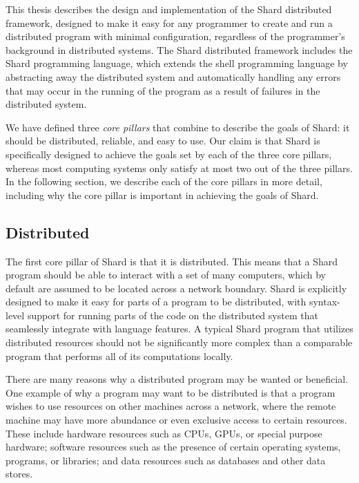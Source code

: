 \documentclass[oneside]{report}
\begin{document}
This thesis describes the design and implementation of the Shard distributed framework, designed to make it easy for any programmer to create and run a distributed program with minimal configuration, regardless of the programmer's background in distributed systems. The Shard distributed framework includes the Shard programming language, which extends the shell programming language by abstracting away the distributed system and automatically handling any errors that may occur in the running of the program as a result of failures in the distributed system.

We have defined three \textit{core pillars} that combine to describe the goals of Shard: it should be distributed, reliable, and easy to use. Our claim is that Shard is specifically designed to achieve the goals set by each of the three core pillars, whereas most computing systems only satisfy at most two out of the three pillars.
In the following section, we describe each of the core pillars in more detail, including why the core pillar is important in achieving the goals of Shard.

\subsection{Distributed}

The first core pillar of Shard is that it is distributed.
This means that a Shard program should be able to interact with a set of many computers, which by default are assumed to be located across a network boundary.
Shard is explicitly designed to make it easy for parts of a program to be distributed, with syntax-level support for running parts of the code on the distributed system that seamlessly integrate with language features.
A typical Shard program that utilizes distributed resources should not be significantly more complex than a comparable program that performs all of its computations locally.

There are many reasons why a distributed program may be wanted or beneficial.
One example of why a program may want to be distributed is that a program wishes to use resources on other machines across a network, where the remote machine may have more abundance or even exclusive access to certain resources.
These include hardware resources such as CPUs, GPUs, or special purpose hardware; software resources such as the presence of certain operating systems, programs, or libraries; and data resources such as databases and other data stores.
\end{document}
